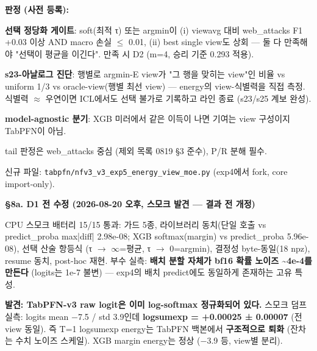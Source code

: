 \textbf{판정 (사전 등록):}

\par\noindent \textbullet\enspace \textbf{선택 정당화 게이트}: soft(최적 τ) 또는 argmin이 (i) viewavg 대비 web\_\allowbreak{}attacks F1 +\allowbreak{}0.03 이상 AND macro 손실 \ensuremath{\leq} 0.01, (ii) best single view도 상회 — 둘 다 만족해야 "선택이 평균을 이긴다". 만족 시 D2 (m=\allowbreak{}4, 승리 기준 0.293 적용).


\par\noindent \textbullet\enspace \textbf{s23-아날로그 진단}: 행별로 argmin-E view가 "그 행을 맞히는 view"인 비율 vs uniform 1/\allowbreak{}3 vs oracle-view(행별 최선 view) — energy의 view-식별력을 직접 측정. 식별력 \ensuremath{\approx} 우연이면 ICL에서도 선택 불가로 기록하고 라인 종료 (s23/\allowbreak{}s25 계보 완성).


\par\noindent \textbullet\enspace \textbf{model-agnostic 분기}: XGB 미러에서 같은 이득이 나면 기여는 view 구성이지 TabPFN이 아님.


\par\noindent \textbullet\enspace tail 판정은 web\_\allowbreak{}attacks 중심 (제외 목록 0819 §3 준수), P/\allowbreak{}R 분해 필수.


신규 파일: \texttt{tabpfn/\allowbreak{}\allowbreak{}n\allowbreak{}fv3\_\allowbreak{}\allowbreak{}v3\_\allowbreak{}\allowbreak{}e\allowbreak{}xp5\_\allowbreak{}\allowbreak{}ener\allowbreak{}gy\_\allowbreak{}\allowbreak{}view\_\allowbreak{}\allowbreak{}moe.\allowbreak{}py} (exp4에서 fork, core import-only).

\textbf{§8a. D1 전 수정 (2026-08-20 오후, 스모크 발견 — 결과 전 개정)}

\par\noindent \textbullet\enspace CPU 스모크 배터리 15/\allowbreak{}15 통과: 가드 5종, 라이브러리 동치(단일 호출 vs predict\_\allowbreak{}proba max|diff| 2.98e-08; XGB softmax(margin) vs predict\_\allowbreak{}proba 5.96e-08), 선택 산술 항등식 (τ \ensuremath{\rightarrow} \ensuremath{\infty}=\allowbreak{}평균, τ \ensuremath{\rightarrow} 0=\allowbreak{}argmin), 결정성 byte-동일(18 npz), resume 동치, post-hoc 재현. 부수 실측: \textbf{배치 분할 자체가 bf16 확률 노이즈 \textasciitilde{}4e-4를 만든다} (logits는 1e-7 불변) — exp4의 배치 predict에도 동일하게 존재하는 고유 특성.


\par\noindent \textbullet\enspace \textbf{발견: TabPFN-v3 raw logit은 이미 log-softmax 정규화되어 있다.} 스모크 덤프 실측: logits mean −7.5 /\allowbreak{} std 3.9인데 \textbf{logsumexp =\allowbreak{} +\allowbreak{}0.00025 ± 0.00007} (전 view 동일). 즉 T=\allowbreak{}1 logsumexp energy는 TabPFN 백본에서 \textbf{구조적으로 퇴화} (잔차는 수치 노이즈 스케일). XGB margin energy는 정상 (−3.9 등, view별 분리).


